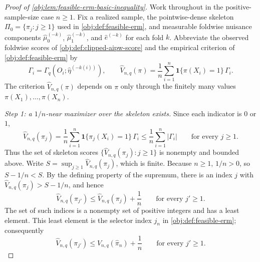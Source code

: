 \documentclass[11pt]{article}
\begin{document}
\begin{proof}[Proof of \cref{obj:lem:feasible-erm-basic-inequality}]
Work throughout in the positive-sample-size case \(n\ge1\).  Fix a realized sample, the pointwise-dense skeleton \(\Pi_0=\{\pi_j:j\ge1\}\) used in \cref{obj:def:feasible-erm}, and measurable foldwise nuisance components \(\widehat\mu_0^{(-k)}\), \(\widehat\mu_1^{(-k)}\), and \(\widehat e^{(-k)}\) for each fold \(k\).  Abbreviate the observed foldwise scores of \cref{obj:def:clipped-aipw-score} and the empirical criterion of \cref{obj:def:feasible-erm} by
\[
\Gamma_i=\Gamma_q\!\left(O_i;\widehat\eta^{(-k(i))}\right),
\qquad
\widehat V_{n,q}(\pi)=\frac1n\sum_{i=1}^n\mathbf 1\{\pi(X_i)=1\}\,\Gamma_i .
\]
The criterion \(\widehat V_{n,q}(\pi)\) depends on \(\pi\) only through the finitely many values \(\pi(X_1),\ldots,\pi(X_n)\).

\emph{Step 1: a \(1/n\)-near maximizer over the skeleton exists.}  Since each indicator is \(0\) or \(1\),
\[
\widehat V_{n,q}(\pi_j)
=\frac1n\sum_{i=1}^n\mathbf 1\{\pi_j(X_i)=1\}\,\Gamma_i
\le\frac1n\sum_{i=1}^n|\Gamma_i|
\qquad\text{for every }j\ge1.
\]
Thus the set of skeleton scores \(\{\widehat V_{n,q}(\pi_j):j\ge1\}\) is nonempty and bounded above.  Write \(S=\sup_{j\ge1}\widehat V_{n,q}(\pi_j)\), which is finite.  Because \(n\ge1\), \(1/n>0\), so \(S-1/n<S\).  By the defining property of the supremum, there is an index \(j\) with \(\widehat V_{n,q}(\pi_j)>S-1/n\), and hence
\[
\widehat V_{n,q}(\pi_{j'})\le \widehat V_{n,q}(\pi_j)+\frac1n
\qquad\text{for every }j'\ge1 .
\]
The set of such indices is a nonempty set of positive integers and has a least element.  This least element is the selector index \(j_n\) in \cref{obj:def:feasible-erm}; consequently
\[
\widehat V_{n,q}(\pi_{j'})\le \widehat V_{n,q}(\widehat\pi_n)+\frac1n
\qquad\text{for every }j'\ge1 .
\]


\end{proof}
\end{document}

